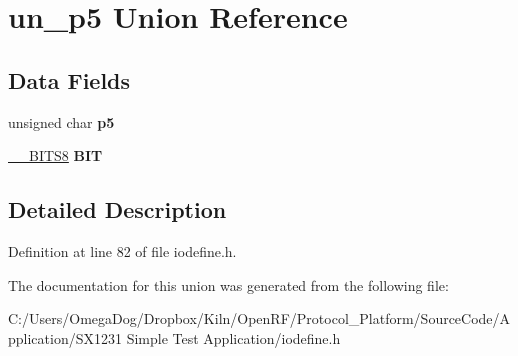 \hypertarget{unionun__p5}{\section{un\-\_\-p5 Union Reference}
\label{unionun__p5}
}
\subsection*{Data Fields}
\begin{DoxyCompactItemize}
\item 
\hypertarget{unionun__p5_abbe34305058e8e0ceb63e818597999e3}{unsigned char {\bfseries p5}}\label{unionun__p5_abbe34305058e8e0ceb63e818597999e3}

\item 
\hypertarget{unionun__p5_aa33977f7812269354059f732354c4364}{\hyperlink{struct_____b_i_t_s8}{\-\_\-\-\_\-\-B\-I\-T\-S8} {\bfseries B\-I\-T}}\label{unionun__p5_aa33977f7812269354059f732354c4364}

\end{DoxyCompactItemize}


\subsection{Detailed Description}


Definition at line 82 of file iodefine.\-h.



The documentation for this union was generated from the following file\-:\begin{DoxyCompactItemize}
\item 
C\-:/\-Users/\-Omega\-Dog/\-Dropbox/\-Kiln/\-Open\-R\-F/\-Protocol\-\_\-\-Platform/\-Source\-Code/\-Application/\-S\-X1231 Simple Test Application/iodefine.\-h\end{DoxyCompactItemize}
